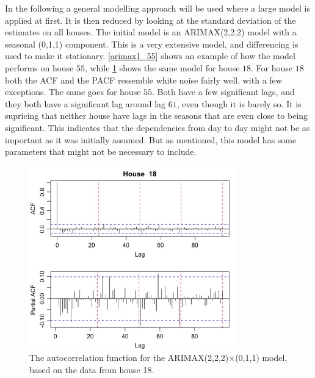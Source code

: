In the following a general modelling approach will be used where a large model is applied at first. It is then reduced by looking at the standard deviation of the estimates on all houses. The initial model is an ARIMAX(2,2,2) model with a seasonal (0,1,1) component. This is a very extensive model, and differencing is used to make it stationary. \cref{arimax1_55} shows an example of how the model performs on house $55$, while \cref{arimax1_18} shows the same model for house $18$. For house $18$ both the ACF and the PACF ressemble white noise fairly well, with a few exceptions. The same goes for house $55$. Both have a few significant lags, and they both have a significant lag around lag $61$, even though it is barely so. It is supricing that neither house have lags in the seasons that are even close to being significant. This indicates that the dependencies from day to day might not be as important as it was initially assumed. But as mentioned, this model has some parameters that might not be necessary to include.




\begin{figure}
    \centering
    \includegraphics[width=0.8\textwidth]{../../../figures/arimax/Arimax1_18.jpeg}
    \caption{The autocorrelation function for the ARIMAX(2,2,2)$\times$(0,1,1) model, based on the data from house 18.}
    \label{arimax1_18}
\end{figure}


